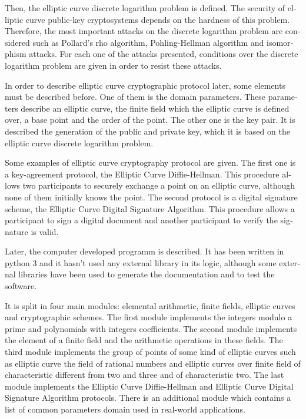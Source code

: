\begin{otherlanguage}{american}
Then, the elliptic curve discrete logarithm problem is defined. The security of elliptic curve public-key cryptosystems depends on the hardness of this problem. Therefore, the most important attacks on the discrete logarithm problem are considered such as Pollard's rho algorithm, Pohling-Hellman algorithm and isomorphism attacks. For each one of the attacks presented, conditions over the discrete logarithm problem are given in order to resist these attacks.

In order to describe elliptic curve cryptographic protocol later, some elements must be described before. One of them is the domain parameters. These parameters describe an elliptic curve, the finite field which the elliptic curve is defined over, a base point and the order of the point. The other one is the key pair. It is described the generation of the public and private key, which it is based on the elliptic curve discrete logarithm problem.

Some examples of elliptic curve cryptography protocol are given. The first one is a key-agreement protocol, the Elliptic Curve Diffie-Hellman. This procedure allows two participants to securely exchange a point on an elliptic curve, although none of them initially knows the point. The second protocol is a digital signature scheme, the Elliptic Curve Digital Signature Algorithm. This procedure allows a participant to sign a digital document and another participant to verify the signature is valid.

Later, the computer developed programm is described. It has been written in python 3 and it hasn't used any external library in its logic, although some external libraries have been used to generate the documentation and to test the software.

It is split in four main modules: elemental arithmetic, finite fields, elliptic curves and cryptographic schemes. The first module implements the integers modulo a prime and polynomials with integers coefficients. The second module implements the element of a finite field and the arithmetic operations in these fields. The third module implements the group of points of some kind of elliptic curves such as elliptic curve the field of rational numbers and elliptic curves over finite field of characteristic different from two and three and of characteristic two. The last module implements the Elliptic Curve Diffie-Hellman and Elliptic Curve Digital Signature Algorithm protocols. There is an additional module which contains a list of common parameters domain used in real-world applications.


\end{otherlanguage}
